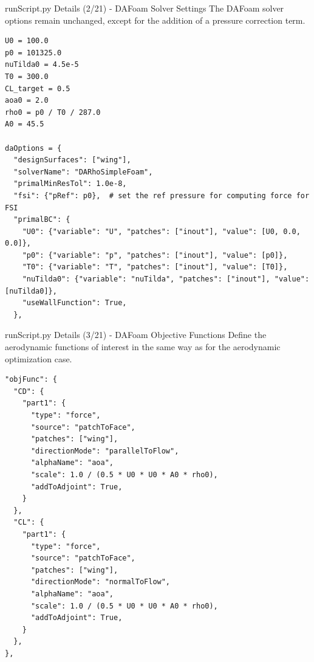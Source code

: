 \documentclass{bredelebeamer}
\begin{document}
\begin{frame}[fragile]{runScript.py Details (2/21) - \large DAFoam Solver Settings}
The DAFoam solver options remain unchanged, except for the addition of a pressure correction term.
\scriptsize
\lstset{ language=bash }
\begin{lstlisting}
U0 = 100.0
p0 = 101325.0
nuTilda0 = 4.5e-5
T0 = 300.0
CL_target = 0.5
aoa0 = 2.0
rho0 = p0 / T0 / 287.0
A0 = 45.5

daOptions = {
  "designSurfaces": ["wing"],
  "solverName": "DARhoSimpleFoam",
  "primalMinResTol": 1.0e-8,
  "fsi": {"pRef": p0},  # set the ref pressure for computing force for FSI
  "primalBC": {
    "U0": {"variable": "U", "patches": ["inout"], "value": [U0, 0.0, 0.0]},
    "p0": {"variable": "p", "patches": ["inout"], "value": [p0]},
    "T0": {"variable": "T", "patches": ["inout"], "value": [T0]},
    "nuTilda0": {"variable": "nuTilda", "patches": ["inout"], "value": [nuTilda0]},
    "useWallFunction": True,
  },
\end{lstlisting}
\normalsize
\end{frame}

\begin{frame}[fragile]{runScript.py Details (3/21) - \large DAFoam Objective Functions}
Define the aerodynamic functions of interest in the same way as for the aerodynamic optimization case.
\scriptsize
\lstset{ language=bash }
\begin{lstlisting}
"objFunc": {
  "CD": {
    "part1": {
      "type": "force",
      "source": "patchToFace",
      "patches": ["wing"],
      "directionMode": "parallelToFlow",
      "alphaName": "aoa",
      "scale": 1.0 / (0.5 * U0 * U0 * A0 * rho0),
      "addToAdjoint": True,
    }
  },
  "CL": {
    "part1": {
      "type": "force",
      "source": "patchToFace",
      "patches": ["wing"],
      "directionMode": "normalToFlow",
      "alphaName": "aoa",
      "scale": 1.0 / (0.5 * U0 * U0 * A0 * rho0),
      "addToAdjoint": True,
    }
  },
},
\end{lstlisting}
\normalsize
\end{frame}
\end{document}
